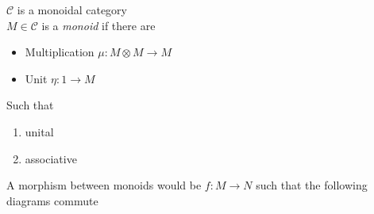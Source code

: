 \documentclass[main]{subfiles}
\begin{document}
\begin{definition}
$\mathscr C$ is a monoidal category \\
$M\in\mathscr C$ is a \textit{monoid} if there are
\begin{itemize}
\item Multiplication $\mu:M\otimes M\to M$
\item Unit $\eta :1\to M$
\end{itemize}
Such that
\begin{enumerate}
\item unital
\begin{center}
\end{center}
\item associative
\begin{center}
\end{center}
\end{enumerate}
A morphism between monoids would be $f:M\to N$ such that the following diagrams commute
\begin{center}
\end{center}


\end{definition}
\end{document}
